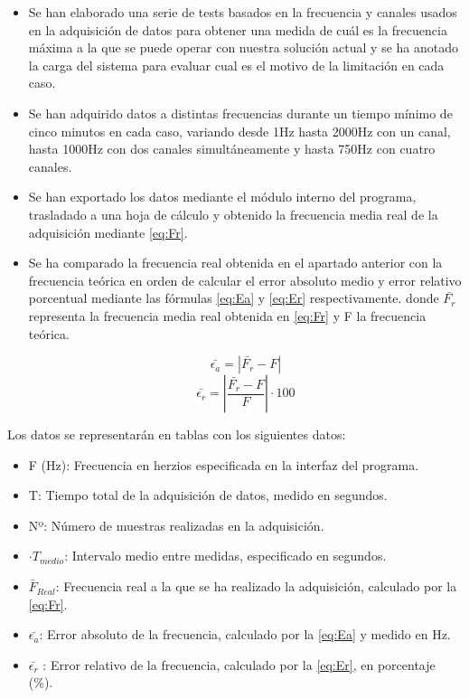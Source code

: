 \begin{itemize}
	\item Se han elaborado una serie de tests basados en la frecuencia y canales usados en la adquisición de datos para obtener una medida de cuál es la frecuencia máxima a la que se puede operar con nuestra solución actual y se ha anotado la carga del sistema para evaluar cual es el motivo de la limitación en cada caso.
	
	\item Se han adquirido datos a distintas frecuencias durante un tiempo mínimo de cinco minutos en cada caso, variando desde 1Hz hasta 2000Hz con un canal, hasta 1000Hz con dos canales simultáneamente y hasta 750Hz con cuatro canales. 
	\item Se han exportado los datos mediante el módulo interno del programa, trasladado a una hoja de cálculo y obtenido la frecuencia media real de la adquisición mediante \ref{eq:Fr}.
	\item Se ha comparado la frecuencia real obtenida en el apartado anterior con la frecuencia teórica en orden de calcular el error absoluto medio y error relativo porcentual mediante las fórmulas \ref{eq:Ea} y \ref{eq:Er} respectivamente. donde $ \bar{F_r} $ representa la frecuencia media real obtenida en \ref{eq:Fr} y F la frecuencia teórica.
	
	 	\begin{equation}\label{eq:Ea}
	 		\bar{\epsilon_{a}}=\left|\bar{F_r}-F\right|
	 	\end{equation}
		\begin{equation}\label{eq:Er}
			 \bar{\epsilon_{r}}=\left|\dfrac{\bar{F_r}-F}{F}\right|\cdot100
		\end{equation}

\end{itemize}
	Los datos se representarán en tablas con los siguientes datos:
	\begin{itemize}
		\item{F (Hz)}: Frecuencia en herzios especificada en la interfaz del programa.
		\item{T}: Tiempo total de la adquisición de datos, medido en segundos.
		\item{Nº}: Número de muestras realizadas en la adquisición.
		\item{$ ·T_{medio} $}: Intervalo medio entre medidas, especificado en segundos.
		\item{$\bar{F}_{Real}$}: Frecuencia real a la que se ha realizado la adquisición, calculado por la \autoref{eq:Fr}.
		\item{$ \bar{\epsilon_{a}} $}: Error absoluto de la frecuencia, calculado por la \autoref{eq:Ea} y medido en Hz.
		\item{$ \bar{\epsilon_{r}} $ }: Error relativo de la frecuencia, calculado por la \autoref{eq:Er}, en porcentaje (\%).
	\end{itemize}

